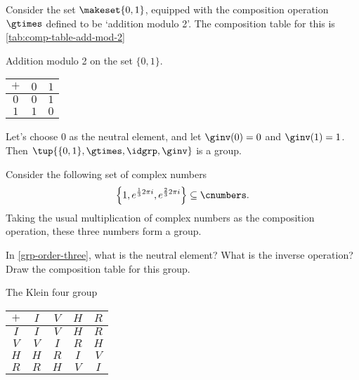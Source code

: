 \begin{example}\label{exa:grp-order-two}
    Consider the set $\makeset{ 0, 1 }$, equipped with the composition operation $\gtimes$ defined to be `addition modulo 2'. The composition table for this is \cref{tab:comp-table-add-mod-2}
    \begin{margintable}
    \caption{Addition modulo 2 on the set $\{ 0, 1 \}$.}
    \label{tab:comp-table-add-mod-2}
    \centering
    \begin{tabular}{c|cc}
        $+$ & $0$ & $1$ \\
        \hline
        $0$   & $0$ & $1$ \\
        $1$    & $1$ & $0$
    \end{tabular}
\end{margintable}

Let's choose $0$ as the neutral element, and let $\ginv(0) = 0$ and $\ginv(1) = 1$. Then $\tup{\{ 0, 1 \}, \gtimes, \idgrp, \ginv}$ is a group.
\end{example}


\begin{example}
    \label{grp-order-three}
    Consider the following set of complex numbers
    \begin{equation*}
        \Big\{ 1, e^{\frac{1}{3}2\pi i}, e^{\frac{2 }{3}2\pi i}  \Big\} \subseteq \cnumbers.
    \end{equation*}
    Taking the usual multiplication of complex numbers as the composition operation, these three numbers form a group.
\end{example}

\begin{gradedexercise}
    \label{ex:GroupWithThreeElements}
    In \cref{grp-order-three}, what is the neutral element?
    What is the inverse operation?
    Draw the composition table for this group.
\end{gradedexercise}


\begin{margintable}
    \caption{The Klein four group}
    \label{tab:comp-table-Klein4}
    \centering
    \begin{tabular}{c|cccc}
        $+$ & $I$ & $V$ & $H$ & $R$ \\
        \hline
        $I$ & $I$ & $V$ & $H$ & $R$ \\
        $V$ & $V$ & $I$ & $R$ & $H$ \\
        $H$ & $H$ & $R$ & $I$ & $V$ \\
        $R$ & $R$ & $H$ & $V$ & $I$
    \end{tabular}
\end{margintable}

